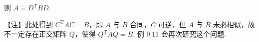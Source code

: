 %
%

则 $A=D^{\mathrm{T}}BD$.

\begin{fnote}
【注】此处得到 $C^{\mathrm{T}}AC=B$，即 $A$ 与 $B$ 合同，$C$ 可逆，但 $A$ 与 $B$ 未必相似，故不一定存在正交矩阵 $Q$，使得 $Q^{\mathrm{T}}AQ=B$. 例 9.11 会再次研究这个问题.
\end{fnote}

